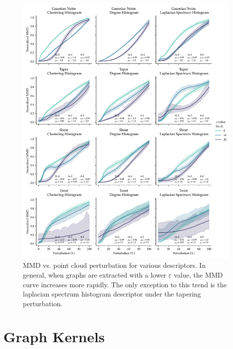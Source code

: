 \begin{figure}
  \includegraphics[width=\textwidth]{./figures/results/res_2_1.pdf}
  \caption[Influence of $\varepsilon$ on the sensitivity of MMD to perturbations.]{MMD vs. point cloud perturbation for various descriptors. In general,
when graphs are extracted with a lower $\varepsilon$ value, the MMD curve
increases more rapidly. The only exception to this trend is the laplacian
spectrum histogram descriptor under the tapering perturbation.}
  \label{fig:mmd_sensitivity_eps}
\end{figure}

\section{Graph Kernels}\label{sec:results_graph_kernels}

